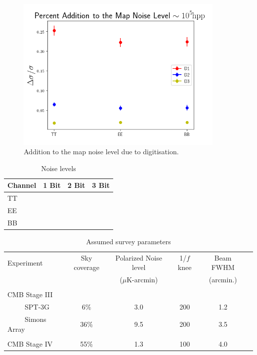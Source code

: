 \documentclass[apj]{emulateapj}
\begin{document}
\begin{figure}[htb]\centering
\includegraphics[width=0.9\textwidth,clip]{Plots/addednoise.png}
  \caption[Current ]{
  Addition to the map noise level due to digitisation. 
           \label{fig:extranoise}
  }
\end{figure}

\begin{table}[tbh]
\begin{center}
\caption{\label{tab:noise} Noise levels}
\small
\begin{tabular}{l | c c c }
 Channel & 1 Bit & 2 Bit & 3 Bit\\
 \hline
 TT & & & \\
 EE & & & \\
 BB & & & \\

\end{tabular}
 \normalsize
\end{center}
\end{table}

\begin{table}[tbh]
\begin{center}
\caption{\label{tab:experiments} Assumed survey parameters}
\small
\begin{tabular}{l || c c c c c }
Experiment & Sky coverage & Polarized Noise level  & 1/$f$ knee & Beam FWHM \\
& &($\mu$K-arcmin)&&(arcmin.)\\
\hline
\tiny \\ \small
CMB Stage III & & & & \\
~~~~~SPT-3G & 6\% & 3.0 & 200 & 1.2 \\
~~~~~Simons Array & 36\% & 9.5 & 200 & 3.5 \\ 
\tiny \\ \small
CMB Stage IV & 55\% & 1.3 & 100 & 4.0 \\
\end{tabular}
 \normalsize
\end{center}
\end{table}
\end{document}
